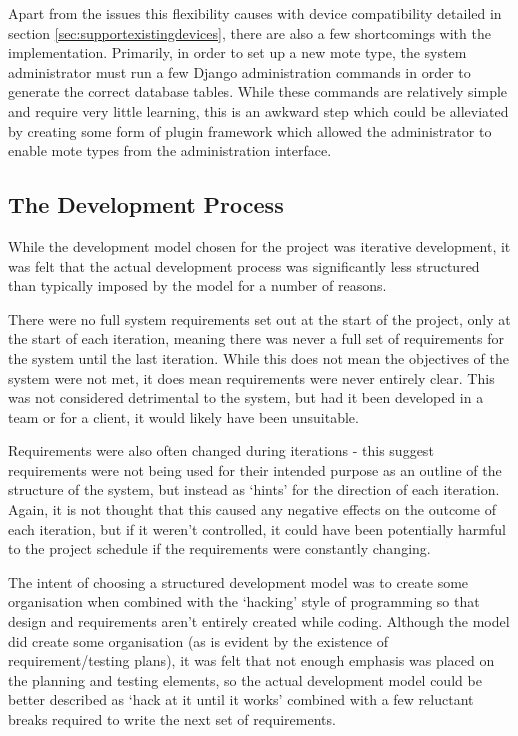 \documentclass[a4papert,11pt,notitlepage]{article}
\begin{document}
Apart from the issues this flexibility causes with device compatibility detailed in section \ref{sec:supportexistingdevices}, there are also a few shortcomings with the implementation. Primarily, in order to set up a new mote type, the system administrator must run a few Django administration commands in order to generate the correct database tables. While these commands are relatively simple and require very little learning, this is an awkward step which could be alleviated by creating some form of plugin framework which allowed the administrator to enable mote types from the administration interface. 

\subsection{The Development Process}
\label{sec:devprocess}
While the development model chosen for the project was iterative development, it was felt that the actual development process was significantly less structured than typically imposed by the model for a number of reasons.

There were no full system requirements set out at the start of the project, only at the start of each iteration, meaning there was never a full set of requirements for the system until the last iteration. While this does not mean the objectives of the system were not met, it does mean requirements were never entirely clear. This was not considered detrimental to the system, but had it been developed in a team or for a client, it would likely have been unsuitable.

Requirements were also often changed during iterations - this suggest requirements were not being used for their intended purpose as an outline of the structure of the system, but instead as `hints' for the direction of each iteration. Again, it is not thought that this caused any negative effects on the outcome of each iteration, but if it weren't controlled, it could have been potentially harmful to the project schedule if the requirements were constantly changing.

The intent of choosing a structured development model was to create some organisation when combined with the `hacking' style of programming so that design and requirements aren't entirely created while coding. Although the model did create some organisation (as is evident by the existence of requirement/testing plans), it was felt that not enough emphasis was placed on the planning and testing elements, so the actual development model could be better described as `hack at it until it works' combined with a few reluctant breaks required to write the next set of requirements.
\end{document}
